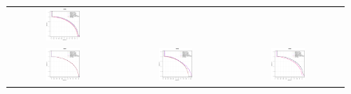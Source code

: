 \begin{figure}[H]
\begin{tabular}{ccc}
  \includegraphics[width=0.33\textwidth]{Figures_Chapter7/Results_Chapter4/Surface_eps/WFG6.eps} \\
  \includegraphics[width=0.33\textwidth]{Figures_Chapter7/Results_Chapter4/Surface_eps/WFG7.eps} &
  \includegraphics[width=0.33\textwidth]{Figures_Chapter7/Results_Chapter4/Surface_eps/WFG8.eps} &
  \includegraphics[width=0.33\textwidth]{Figures_Chapter7/Results_Chapter4/Surface_eps/WFG9.eps}
\end{tabular}
\end{figure}



